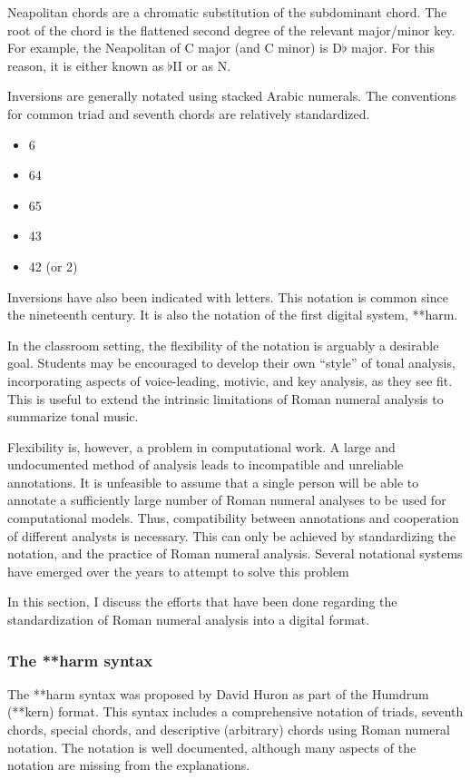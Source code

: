 Neapolitan chords are a chromatic substitution of the subdominant chord.
The root of the chord is the flattened second degree of the relevant major/minor key.
For example, the Neapolitan of C major (and C minor) is D$\flat$ major.
For this reason, it is either known as $\flat$II or as N.

Inversions are generally notated using stacked Arabic numerals.
The conventions for common triad and seventh chords are relatively standardized.

\begin{itemize}
    \item 6
    \item 64
    \item 65
    \item 43
    \item 42 (or 2)
\end{itemize}

Inversions have also been indicated with letters.
This notation is common since the nineteenth century.
It is also the notation of the first digital system, **harm.

In the classroom setting, the flexibility of the notation is arguably a desirable goal.
Students may be encouraged to develop their own ``style'' of tonal analysis, incorporating aspects of voice-leading, motivic, and key analysis, as they see fit.
This is useful to extend the intrinsic limitations of Roman numeral analysis to summarize tonal music.

Flexibility is, however, a problem in computational work.
A large and undocumented method of analysis leads to incompatible and unreliable annotations.
It is unfeasible to assume that a single person will be able to annotate a sufficiently large number of Roman numeral analyses to be used for computational models.
Thus, compatibility between annotations and cooperation of different analysts is necessary.
This can only be achieved by standardizing the notation, and the practice of Roman numeral analysis.
Several notational systems have emerged over the years to attempt to solve this problem

In this section, I discuss the efforts that have been done regarding the standardization of Roman numeral analysis into a digital format.

\subsubsection{The **harm syntax}
The **harm syntax was proposed by David Huron as part of the Humdrum (**kern) format.
This syntax includes a comprehensive notation of triads, seventh chords, special chords, and descriptive (arbitrary) chords using Roman numeral notation.
The notation is well documented, although many aspects of the notation are missing from the explanations.

